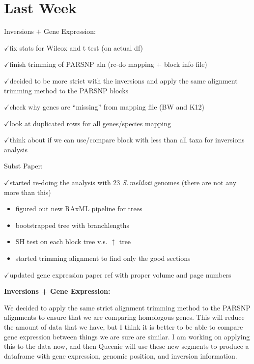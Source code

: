 \documentclass[12pt]{article}
\newcommand{\smel}{\textit{S.\,meliloti}\xspace}
\newcommand{\ch}{$\checkmark$}
\begin{document}

	
\section*{Last Week}


Inversions $+$ Gene Expression:

\ch fix stats for Wilcox and t test (on actual df)

\ch finish trimming of PARSNP aln (re-do mapping + block info file)




\ch decided to be more strict with the inversions and apply the same alignment trimming method to the PARSNP blocks

\ch check why genes are ``missing'' from mapping file (BW and K12)

\ch look at duplicated rows for all genes/species mapping

\ch think about if we can use/compare block with less than all taxa for inversions analysis

Subst Paper:

\ch started re-doing the analysis with 23 \smel genomes (there are not any more than this)
\begin{itemize}
	\item figured out new RAxML pipeline for trees
	\item bootstrapped tree with branchlengths
	\item SH test on each block tree v.s. $\uparrow$ tree
	\item started trimming alignment to find only the good sections
\end{itemize}

\ch updated gene expression paper ref with proper volume and page numbers






\textbf{Inversions + Gene Expression:}

We decided to apply the same strict alignment trimming method to the PARSNP alignments to ensure that we are comparing homologous genes.
This will reduce the amount of data that we have, but I think it is better to be able to compare gene expression between things we are sure are similar.
I am working on applying this to the data now, and then Queenie will use these new segments to produce a dataframe with gene expression, genomic position, and inversion information.
\end{document}
